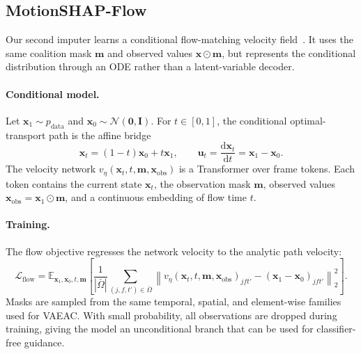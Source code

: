 \subsection{MotionSHAP-Flow}
\label{sec:flow_imputer}

Our second imputer learns a conditional flow-matching velocity field~\citep{liu2022flow,lipman2022flow,tong2023conditional}.  It uses the same coalition mask $\mathbf{m}$ and observed values $\mathbf{x}\odot\mathbf{m}$, but represents the conditional distribution through an ODE rather than a latent-variable decoder.

\paragraph{Conditional model.}
Let $\mathbf{x}_1\sim p_{\mathrm{data}}$ and $\mathbf{x}_0\sim\mathcal{N}(\mathbf{0},\mathbf{I})$.  For $t\in[0,1]$, the conditional optimal-transport path is the affine bridge
\begin{equation}
  \mathbf{x}_t=(1-t)\mathbf{x}_0+t\mathbf{x}_1,
  \qquad
  \mathbf{u}_t=\frac{\mathrm{d}\mathbf{x}_t}{\mathrm{d}t}
  =\mathbf{x}_1-\mathbf{x}_0.
  \label{eq:condot_path}
\end{equation}
The velocity network $v_\eta(\mathbf{x}_t,t,\mathbf{m},\mathbf{x}_{\mathrm{obs}})$ is a Transformer over frame tokens.  Each token contains the current state $\mathbf{x}_t$, the observation mask $\mathbf{m}$, observed values $\mathbf{x}_{\mathrm{obs}}=\mathbf{x}_1\odot\mathbf{m}$, and a continuous embedding of flow time $t$.

\paragraph{Training.}
The flow objective regresses the network velocity to the analytic path velocity:
\begin{equation}
  \mathcal{L}_{\mathrm{flow}}
  =
  \mathbb{E}_{\mathbf{x}_1,\mathbf{x}_0,t,\mathbf{m}}
  \left[
    \frac{1}{|\bar{\Omega}|}
    \sum_{(j,f,t')\in\bar{\Omega}}
    \left\|
      v_\eta(\mathbf{x}_t,t,\mathbf{m},\mathbf{x}_{\mathrm{obs}})_{jft'}
      -
      (\mathbf{x}_1-\mathbf{x}_0)_{jft'}
    \right\|_2^2
  \right].
  \label{eq:flow_loss}
\end{equation}
Masks are sampled from the same temporal, spatial, and element-wise families used for VAEAC.  With small probability, all observations are dropped during training, giving the model an unconditional branch that can be used for classifier-free guidance.

